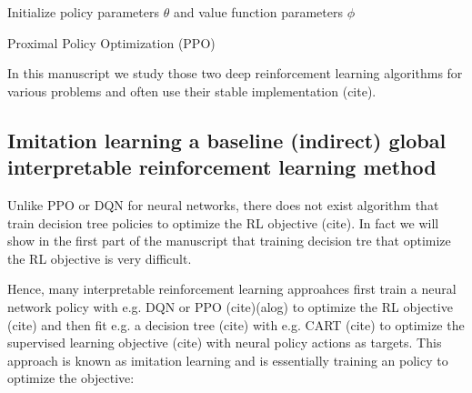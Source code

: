 \begin{algorithm}
    Initialize policy parameters $\theta$ and value function parameters $\phi$ \\
    \caption{Proximal Policy Optimization (PPO)}\label{alg:ppo}
\end{algorithm}
In this manuscript we study those two deep reinforcement learning algorithms for various problems and often use their stable implementation (cite).

\subsection{Imitation learning a baseline (indirect) global interpretable reinforcement learning method}

Unlike PPO or DQN for neural networks, there does not exist algorithm that train decision tree policies to optimize the RL objective (cite).
In fact we will show in the first part of the manuscript that training decision tre that optimize the RL objective is very difficult.

Hence, many interpretable reinforcement learning approahces first train a neural network policy with e.g. DQN or PPO (cite)(alog) to optimize the RL objective (cite) and then fit e.g. a decision tree (cite) with e.g. CART (cite) to optimize the supervised learning objective (cite) with neural policy actions as targets.
This approach is known as imitation learning and is essentially training an policy to optimize the objective:

